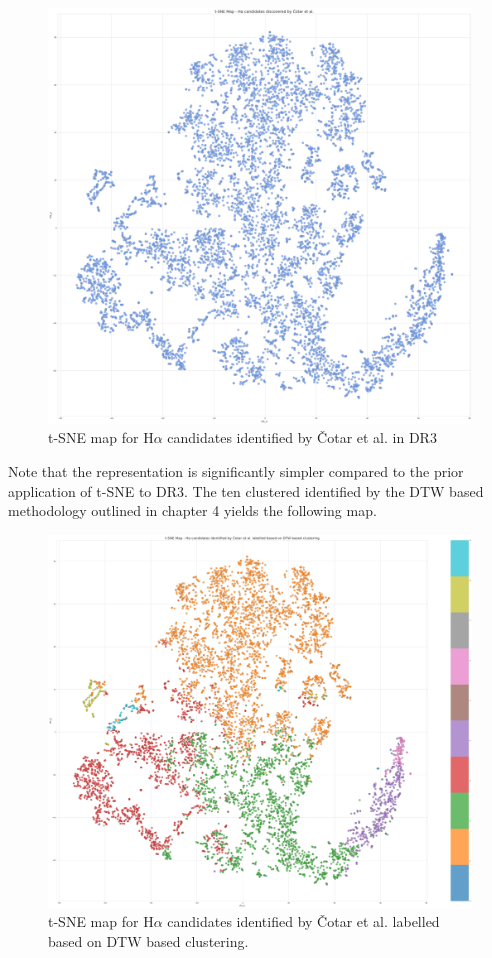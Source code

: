 \begin{figure}[h]
\centering
\includegraphics[scale=0.12]{figures/t-sne cotar et al.png}
\caption{t-SNE map for H$\alpha$ candidates identified by Čotar et al. in DR3}
\end{figure}

Note that the representation is significantly simpler compared to the prior application of t-SNE to DR3. The ten clustered identified by the DTW based methodology outlined in chapter 4 yields the following map.

\begin{figure}[t]
\centering
\includegraphics[scale=0.16]{figures/t-sne colored by dtw.png}
\caption{t-SNE map for H$\alpha$ candidates identified by Čotar et al. labelled based on DTW based clustering.}
\end{figure}

